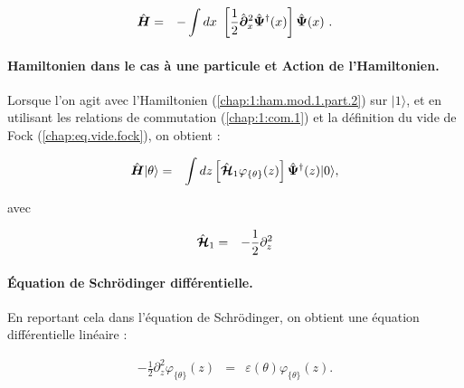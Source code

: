\begin{eqnarray}
	\operator{H} & = & -\int dx  \left [\frac{1}{2}\operator{\partial}_x^2 \operator{\Psi}^\dag(x)\right ] \operator{\Psi}(x)  \label{chap:1:ham.mod.1.part.2}.
\end{eqnarray}


\paragraph{Hamiltonien dans le cas à une particule et Action de l’Hamiltonien. }

Lorsque l’on agit avec l’Hamiltonien (\ref{chap:1:ham.mod.1.part.2}) sur \(\vert 1 \rangle\), et en utilisant les relations de commutation (\ref{chap:1:com.1}) et la définition du vide de Fock (\ref{chap:eq.vide.fock}), on obtient : 

\begin{eqnarray}
	\hat{\bm{H}}\vert \theta \rangle & = & \int dz \left [\hat{\bm{\mathcal{H}}}_1  \varphi_{\{\theta\}}(z)  \right ] \hat{\bm{\Psi}}^\dag (z)	 \vert 0 \rangle,	
\end{eqnarray}

avec 

\begin{eqnarray*}
		\hat{\bm{\mathcal{H}}}_1 & = & - \frac{1}{2} \partial_z^2
\end{eqnarray*}


\paragraph{Équation de Schrödinger différentielle.}

En reportant cela dans l’équation de Schrödinger, on obtient une équation différentielle linéaire :

\begin{eqnarray}
	- \frac{1}{2} \partial_z^2 \varphi_{\{\theta\}}(z) & = & \varepsilon(\theta) \varphi_{\{\theta\}}(z). \label{chap:eq.onebody.schrod}
\end{eqnarray}




